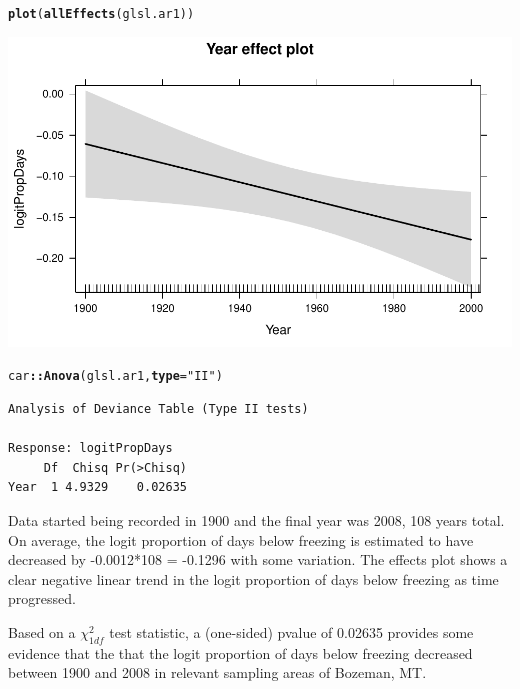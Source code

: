 \documentclass[11pt]{article}\usepackage[]{graphicx}\usepackage[]{color}
\makeatletter
\def\maxwidth{ %
  \ifdim\Gin@nat@width>\linewidth
    \linewidth
  \else
    \Gin@nat@width
  \fi
}
\newcommand{\hlstr}[1]{\textcolor[rgb]{0,0,0}{#1}}%
\newcommand{\hlopt}[1]{\textcolor[rgb]{0,0,0}{\textbf{#1}}}%
\newcommand{\hlstd}[1]{\textcolor[rgb]{0,0,0}{#1}}%
\newcommand{\hlkwc}[1]{\textcolor[rgb]{0,0,0}{\textbf{#1}}}%
\newcommand{\hlkwd}[1]{\textcolor[rgb]{0,0,0}{\textbf{#1}}}%
\newenvironment{kframe}{%
 \def\at@end@of@kframe{}%
 \ifinner\ifhmode%
  \def\at@end@of@kframe{\end{minipage}}%
  \begin{minipage}{\columnwidth}%
 \fi\fi%
 \def\FrameCommand##1{\hskip\@totalleftmargin \hskip-\fboxsep
 \colorbox{shadecolor}{##1}\hskip-\fboxsep
     \hskip-\linewidth \hskip-\@totalleftmargin \hskip\columnwidth}%
 \MakeFramed {\advance\hsize-\width
   \@totalleftmargin\z@ \linewidth\hsize
   \@setminipage}}%
 {\par\unskip\endMakeFramed%
 \at@end@of@kframe}
\newenvironment{knitrout}{}{} %
\makeatother
\begin{document}
\begin{enumerate}
\begin{enumerate}
\begin{knitrout}\footnotesize
{}\color{fgcolor}\begin{kframe}
\begin{alltt}
\hlkwd{plot}\hlstd{(}\hlkwd{allEffects}\hlstd{(glsl.ar1))}
\end{alltt}
\end{kframe}

{\centering \includegraphics[width=\maxwidth]{figure/prob4b-1} 

}


\begin{kframe}\begin{alltt}
\hlstd{car}\hlopt{::}\hlkwd{Anova}\hlstd{(glsl.ar1,} \hlkwc{type} \hlstd{=} \hlstr{"II"}\hlstd{)}
\end{alltt}
\begin{verbatim}
Analysis of Deviance Table (Type II tests)

Response: logitPropDays
     Df  Chisq Pr(>Chisq)
Year  1 4.9329    0.02635
\end{verbatim}
\end{kframe}
\end{knitrout}

Data started being recorded in 1900 and the final year was 2008, 108 years total. On average, the logit proportion of days below freezing is estimated to have decreased by -0.0012*108 = -0.1296 with some variation. The effects plot shows a clear negative linear trend in the logit proportion of days below freezing as time progressed.

Based on a $\chi^2_{1df}$ test statistic, a (one-sided) pvalue of 0.02635 provides some evidence that the that the logit proportion of days below freezing decreased between 1900 and 2008 in relevant sampling areas of Bozeman, MT.
\end{enumerate}


\end{enumerate}
\end{document}
